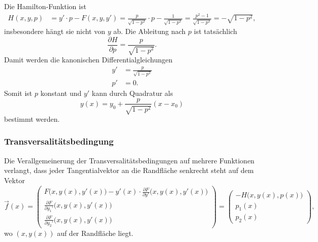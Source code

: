 \begin{beispiel}
Die Hamilton-Funktion ist
\begin{align*}
H(x,y,p)
&=
y'\cdot p - F(x,y,y')
=
\frac{p}{\sqrt{1-p^2}}\cdot p - \frac{1}{\sqrt{1-p^2}}
=
\frac{p^2-1}{\sqrt{1-p^2}}
=
-\sqrt{1-p^2},
\end{align*}
insbesondere hängt sie nicht von $y$ ab.
Die Ableitung nach $p$ ist tatsächlich
\begin{equation}
\frac{\partial H}{\partial p}
=
\frac{p}{\sqrt{1-p^2}}.
\label{buch:hamiltonjacobi:kanonisch:bsp:dHdp}
\end{equation}
Damit werden die kanonischen Differentialgleichungen
\begin{align*}
y' &= \frac{p}{\sqrt{1-p^2}} \\
p' &= 0.
\end{align*}
Somit ist $p$ konstant und $y'$ kann durch Quadratur als
\[
y(x)
=
y_0 + \frac{p}{\sqrt{1-p^2}}(x-x_0)
\]
bestimmt werden.
\end{beispiel}

%
%
\subsubsection{Transversalitätsbedingung}
Die Verallgemeinerung der Transversalitätsbedingungen auf mehrere
Funktionen verlangt, dass jeder Tangentialvektor an die Randfläche
senkrecht steht auf dem Vektor
\[
\vec{f}(x)
=
\begin{pmatrix}
\displaystyle
F\bigl(x,y(x),y'(x)\bigr)
-
y'(x)\cdot \frac{\partial F}{\partial y'}\bigl(x,y(x),y'(x)\bigr)
\\
\displaystyle
\frac{\partial F}{\partial y_1'}\bigl(x,y(x),y'(x)\bigr)
\\[9pt]
\displaystyle
\frac{\partial F}{\partial y_2'}\bigl(x,y(x),y'(x)\bigr)
\end{pmatrix}
=
\begin{pmatrix}
-H\bigl(x,y(x),p(x)\bigr)\\
p_1(x)\\
p_2(x)
\end{pmatrix},
\]
wo $(x,y(x))$ auf der Randfläche liegt.

